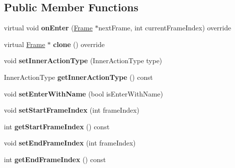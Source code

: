 \subsection*{Public Member Functions}
\begin{DoxyCompactItemize}
\item 
\mbox{\label{classInnerActionFrame_ad1ce94935e6f26d8af942004da943551}} 
virtual void {\bfseries on\+Enter} (\hyperlink{classFrame}{Frame} $\ast$next\+Frame, int current\+Frame\+Index) override
\item 
\mbox{\label{classInnerActionFrame_aaa582a5f8d96c5a933d8e80ae5a04670}} 
virtual \hyperlink{classFrame}{Frame} $\ast$ {\bfseries clone} () override
\item 
\mbox{\label{classInnerActionFrame_a741d2e51b801534712ed611ef74baa59}} 
void {\bfseries set\+Inner\+Action\+Type} (Inner\+Action\+Type type)
\item 
\mbox{\label{classInnerActionFrame_a58b5dc2b221ebd5609373143eca75200}} 
Inner\+Action\+Type {\bfseries get\+Inner\+Action\+Type} () const
\item 
\mbox{\label{classInnerActionFrame_a1cf65b1be5d458decfc6fd4ab808bef7}} 
void {\bfseries set\+Enter\+With\+Name} (bool is\+Enter\+With\+Name)
\item 
\mbox{\label{classInnerActionFrame_a3deb36c15486ef7b5578c0c4a0622b74}} 
void {\bfseries set\+Start\+Frame\+Index} (int frame\+Index)
\item 
\mbox{\label{classInnerActionFrame_a3a0afd126fc27a174f0782a1799e3311}} 
int {\bfseries get\+Start\+Frame\+Index} () const
\item 
\mbox{\label{classInnerActionFrame_a56daba40ea933f77d001f44b0737f801}} 
void {\bfseries set\+End\+Frame\+Index} (int frame\+Index)
\item 
\mbox{\label{classInnerActionFrame_a6b7d3e30b5a89e37b43fc5684d7548b5}} 
int {\bfseries get\+End\+Frame\+Index} () const
\item 

\end{DoxyCompactItemize}
